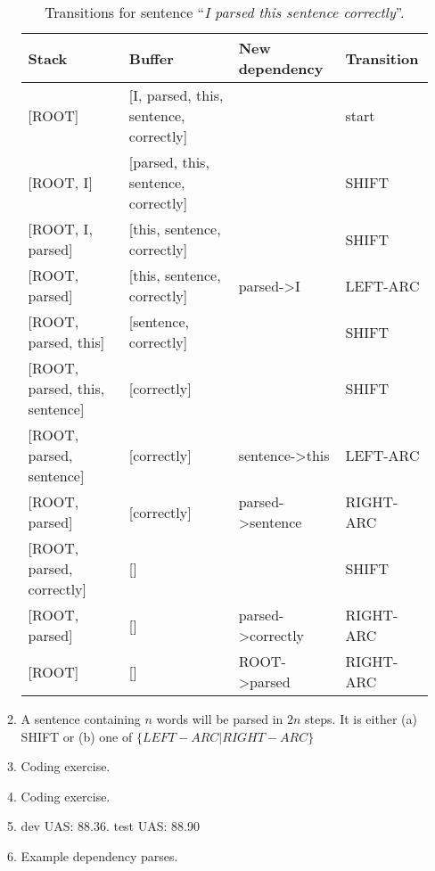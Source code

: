 \documentclass[]{article}
\begin{document}
\begin{enumerate}
\begin{enumerate}
\begin{table}[]
\begin{tabular}{|l|l|l|l|}
\hline
Stack                              & Buffer                                     & New dependency                 & Transition \\ \hline
{[}ROOT{]}                         & {[}I, parsed, this, sentence, correctly{]} &                                & start      \\ \hline
{[}ROOT, I{]}                      & {[}parsed, this, sentence, correctly{]}    &                                & SHIFT      \\ \hline
{[}ROOT, I, parsed{]}              & {[}this, sentence, correctly{]}            &                                & SHIFT      \\ \hline
{[}ROOT, parsed{]}                 & {[}this, sentence, correctly{]}            & parsed-\textgreater{}I         & LEFT-ARC   \\ \hline
{[}ROOT, parsed, this{]}           & {[}sentence, correctly{]}                  &                                & SHIFT      \\ \hline
{[}ROOT, parsed, this, sentence{]} & {[}correctly{]}                            &                                & SHIFT      \\ \hline
{[}ROOT, parsed, sentence{]}       & {[}correctly{]}                            & sentence-\textgreater{}this    & LEFT-ARC   \\ \hline
{[}ROOT, parsed{]}                 & {[}correctly{]}                            & parsed-\textgreater{}sentence  & RIGHT-ARC  \\ \hline
{[}ROOT, parsed, correctly{]}      & {[}{]}                                     &                                & SHIFT      \\ \hline
{[}ROOT, parsed{]}                 & {[}{]}                                     & parsed-\textgreater{}correctly & RIGHT-ARC  \\ \hline
{[}ROOT{]}                         & {[}{]}                                     & ROOT-\textgreater{}parsed      & RIGHT-ARC  \\ \hline
\end{tabular}
\caption{Transitions for sentence \enquote{\textit{I parsed this sentence correctly}}.}
\label{table:sentencetransitions}
\end{table}
	
	
	\item A sentence containing $n$ words will be parsed in $2n$ steps.  
	It is either (a) SHIFT  or (b)  one of $\{LEFT-ARC | RIGHT-ARC\} $
	\item Coding exercise.
	\item Coding exercise.
	\item dev UAS: 88.36. test UAS: 88.90
	\item Example dependency parses.
	

\end{enumerate}
\end{enumerate}
\end{document}
